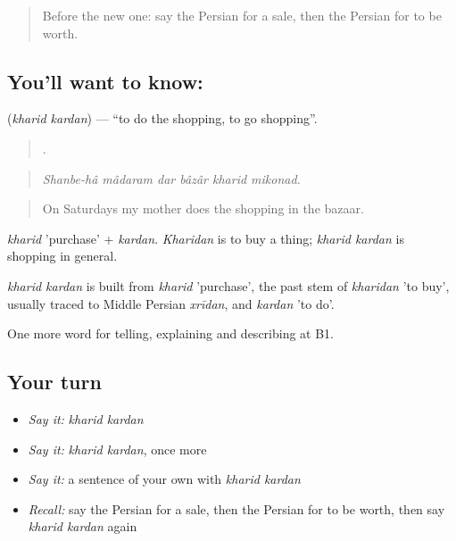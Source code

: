 \label{lesson:FA-C462-kharid-kardan}



\begin{quote}
Before the new one: say the Persian for a sale, then the Persian for to be worth.
\end{quote}

\subsection*{You'll want to know:  }
\textbf{ } (\emph{kharid kardan}) — \textquotedblleft{}to do the shopping, to go shopping\textquotedblright{}.

\begin{quote}
      .
\end{quote}

\begin{quote}
\emph{Shanbe-hâ mâdaram dar bâzâr kharid mikonad.}
\end{quote}

\begin{quote}
On Saturdays my mother does the shopping in the bazaar.
\end{quote}

\emph{kharid} 'purchase' + \emph{kardan}. \emph{Kharidan} is to buy a thing; \emph{kharid kardan} is shopping in general.

\begin{cousinweb}
\emph{kharid kardan} is built from \emph{kharid} 'purchase', the past stem of \emph{kharidan} 'to buy', usually traced to Middle Persian \emph{xrīdan}, and \emph{kardan} 'to do'.
\end{cousinweb}

\begin{grammarlens}[title={What you've built}]
One more word for telling, explaining and describing at B1.
\end{grammarlens}

\subsection*{Your turn}
\begin{itemize}
\raggedright
  \item \emph{Say it:} \emph{kharid kardan}
  \item \emph{Say it:} \emph{kharid kardan}, once more
  \item \emph{Say it:} a sentence of your own with \emph{kharid kardan}
  \item \emph{Recall:} say the Persian for a sale, then the Persian for to be worth, then say \emph{kharid kardan} again
\end{itemize}

